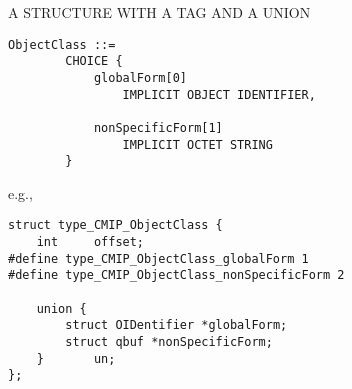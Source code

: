 \begin{bwslide}

\begin{nrtc}
\item	A STRUCTURE WITH A TAG AND A UNION
\begin{verbatim}
ObjectClass ::=
        CHOICE {
            globalForm[0]
                IMPLICIT OBJECT IDENTIFIER,

            nonSpecificForm[1]
                IMPLICIT OCTET STRING
        }
\end{verbatim}

e.g.,
\begin{verbatim}
struct type_CMIP_ObjectClass {
    int     offset;
#define type_CMIP_ObjectClass_globalForm 1
#define type_CMIP_ObjectClass_nonSpecificForm 2

    union {
        struct OIDentifier *globalForm;
        struct qbuf *nonSpecificForm;
    }       un;
};
\end{verbatim}
\end{nrtc}
\end{bwslide}


%
%
%
%
%


